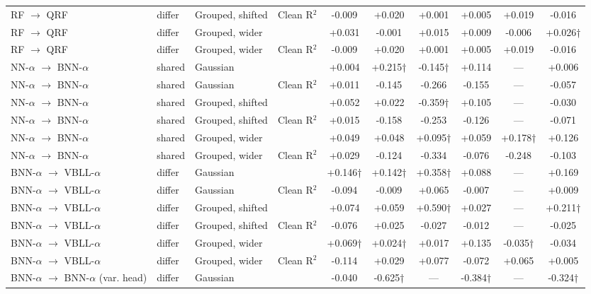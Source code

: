 \begin{landscape}
{\begin{longtable}{llllcccccc}
RF $\rightarrow$ QRF & differ & Grouped, shifted & Clean R$^2$ & -0.009 & +0.020 & +0.001 & +0.005 & +0.019 & -0.016 \\
RF $\rightarrow$ QRF & differ & Grouped, wider & \aucnorm{} & +0.031 & -0.001 & +0.015 & +0.009 & -0.006 & +0.026† \\
RF $\rightarrow$ QRF & differ & Grouped, wider & Clean R$^2$ & -0.009 & +0.020 & +0.001 & +0.005 & +0.019 & -0.016 \\
NN-$\alpha$ $\rightarrow$ BNN-$\alpha$ & shared & Gaussian & \aucnorm{} & +0.004 & +0.215† & -0.145† & +0.114 & --- & +0.006 \\
NN-$\alpha$ $\rightarrow$ BNN-$\alpha$ & shared & Gaussian & Clean R$^2$ & +0.011 & -0.145 & -0.266 & -0.155 & --- & -0.057 \\
NN-$\alpha$ $\rightarrow$ BNN-$\alpha$ & shared & Grouped, shifted & \aucnorm{} & +0.052 & +0.022 & -0.359† & +0.105 & --- & -0.030 \\
NN-$\alpha$ $\rightarrow$ BNN-$\alpha$ & shared & Grouped, shifted & Clean R$^2$ & +0.015 & -0.158 & -0.253 & -0.126 & --- & -0.071 \\
NN-$\alpha$ $\rightarrow$ BNN-$\alpha$ & shared & Grouped, wider & \aucnorm{} & +0.049 & +0.048 & +0.095† & +0.059 & +0.178† & +0.126 \\
NN-$\alpha$ $\rightarrow$ BNN-$\alpha$ & shared & Grouped, wider & Clean R$^2$ & +0.029 & -0.124 & -0.334 & -0.076 & -0.248 & -0.103 \\
BNN-$\alpha$ $\rightarrow$ VBLL-$\alpha$ & differ & Gaussian & \aucnorm{} & +0.146† & +0.142† & +0.358† & +0.088 & --- & +0.169 \\
BNN-$\alpha$ $\rightarrow$ VBLL-$\alpha$ & differ & Gaussian & Clean R$^2$ & -0.094 & -0.009 & +0.065 & -0.007 & --- & +0.009 \\
BNN-$\alpha$ $\rightarrow$ VBLL-$\alpha$ & differ & Grouped, shifted & \aucnorm{} & +0.074 & +0.059 & +0.590† & +0.027 & --- & +0.211† \\
BNN-$\alpha$ $\rightarrow$ VBLL-$\alpha$ & differ & Grouped, shifted & Clean R$^2$ & -0.076 & +0.025 & -0.027 & -0.012 & --- & -0.025 \\
BNN-$\alpha$ $\rightarrow$ VBLL-$\alpha$ & differ & Grouped, wider & \aucnorm{} & +0.069† & +0.024† & +0.017 & +0.135 & -0.035† & -0.034 \\
BNN-$\alpha$ $\rightarrow$ VBLL-$\alpha$ & differ & Grouped, wider & Clean R$^2$ & -0.114 & +0.029 & +0.077 & -0.072 & +0.065 & +0.005 \\
BNN-$\alpha$ $\rightarrow$ BNN-$\alpha$ (var. head) & differ & Gaussian & \aucnorm{} & -0.040 & -0.625† & --- & -0.384† & --- & -0.324† \\

\end{longtable}}
\end{landscape}
